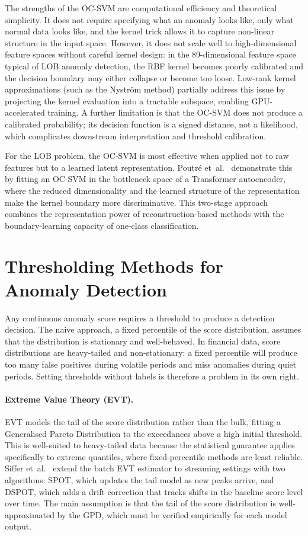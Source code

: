 \documentclass[11pt]{report}
\begin{document}
The strengths of the OC-SVM are computational efficiency and theoretical simplicity. It does not require specifying what an anomaly looks like, only what normal data looks like, and the kernel trick allows it to capture non-linear structure in the input space. However, it does not scale well to high-dimensional feature spaces without careful kernel design: in the 89-dimensional feature space typical of LOB anomaly detection, the RBF kernel becomes poorly calibrated and the decision boundary may either collapse or become too loose. Low-rank kernel approximations (such as the Nystr\"om method) partially address this issue by projecting the kernel evaluation into a tractable subspace, enabling GPU-accelerated training. A further limitation is that the OC-SVM does not produce a calibrated probability; its decision function is a signed distance, not a likelihood, which complicates downstream interpretation and threshold calibration.

For the LOB problem, the OC-SVM is most effective when applied not to raw features but to a learned latent representation. Poutr\'e et~al.~\cite{poutre_2024} demonstrate this by fitting an OC-SVM in the bottleneck space of a Transformer autoencoder, where the reduced dimensionality and the learned structure of the representation make the kernel boundary more discriminative. This two-stage approach combines the representation power of reconstruction-based methods with the boundary-learning capacity of one-class classification.

\section{Thresholding Methods for Anomaly Detection}\label{sec:background:thresholding}

Any continuous anomaly score requires a threshold to produce a detection decision. The naive approach, a fixed percentile of the score distribution, assumes that the distribution is stationary and well-behaved. In financial data, score distributions are heavy-tailed and non-stationary: a fixed percentile will produce too many false positives during volatile periods and miss anomalies during quiet periods. Setting thresholds without labels is therefore a problem in its own right.

\paragraph{Extreme Value Theory (EVT).}
EVT models the tail of the score distribution rather than the bulk, fitting a Generalised Pareto Distribution to the exceedances above a high initial threshold. This is well-suited to heavy-tailed data because the statistical guarantee applies specifically to extreme quantiles, where fixed-percentile methods are least reliable. Siffer et~al.~\cite{siffer:hal-01640325} extend the batch EVT estimator to streaming settings with two algorithms: SPOT, which updates the tail model as new peaks arrive, and DSPOT, which adds a drift correction that tracks shifts in the baseline score level over time. The main assumption is that the tail of the score distribution is well-approximated by the GPD, which must be verified empirically for each model output.
\end{document}
